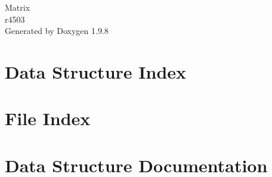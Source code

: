 \documentclass[twoside]{book}
\newcommand{\+}{\discretionary{\mbox{\scriptsize$\hookleftarrow$}}{}{}}
\newcommand{\clearemptydoublepage}{%
    \newpage{\pagestyle{empty}\cleardoublepage}%
  }
\begin{document}
  \raggedbottom
    \hypersetup{pageanchor=false,
                bookmarksnumbered=true,
                pdfencoding=unicode
               }
  \begin{titlepage}
  \vspace*{7cm}
  \begin{center}%
  {\Large Matrix}\\
  [1ex]\large r4503 \\
  \vspace*{1cm}
  {\large Generated by Doxygen 1.9.8}\\
  \end{center}
  \end{titlepage}
  \clearemptydoublepage
  \tableofcontents
  \clearemptydoublepage
  \hypersetup{pageanchor=true}
\chapter{Data Structure Index}

\chapter{File Index}

\chapter{Data Structure Documentation}




\end{document}
